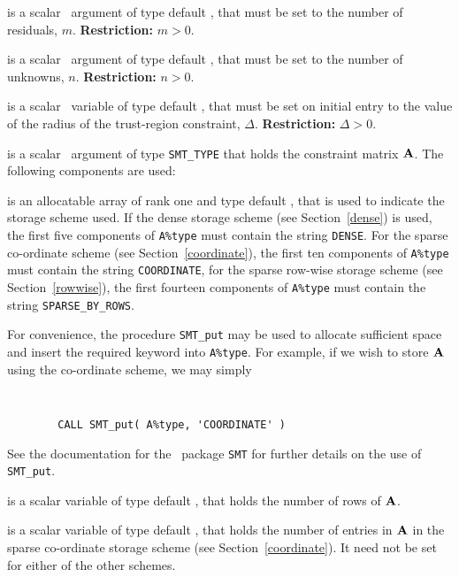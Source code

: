 \documentclass{galahad}
\begin{document}
\begin{description}

 is a scalar \intentin\ argument of type default \integer, that must be
set to the number of residuals, $m$. {\bf Restriction: } $m  >  0$.

 is a scalar \intentin\ argument of type default \integer, that must be
set to the number of unknowns, $n$. {\bf Restriction: } $n  >  0$.

 is a scalar \intentin\ variable of type default \realdp,
that must be set on initial entry
to the value of the radius of the trust-region constraint, $\Delta$.
{\bf Restriction: } $\Delta > 0$.

 is a scalar \intentin\ argument of type {\tt SMT\_TYPE}
that holds the constraint matrix ${\mathbf{A}}$. The following components are used:

\begin{description}

 is an allocatable array of rank one and type default
\character, that
is used to indicate the storage scheme used. If the dense storage scheme
(see Section~\ref{dense}) is used,
the first five components of {\tt A\%type} must contain the
string {\tt DENSE}.
For the sparse co-ordinate scheme (see Section~\ref{coordinate}),
the first ten components of {\tt A\%type} must contain the
string {\tt COORDINATE},
for the sparse row-wise storage scheme (see Section~\ref{rowwise}),
the first fourteen components of {\tt A\%type} must contain the
string {\tt SPARSE\_BY\_ROWS}.

For convenience, the procedure {\tt SMT\_put}
may be used to allocate sufficient space and insert the required keyword
into {\tt A\%type}.
For example, if we wish to store ${\mathbf{A}}$ using the co-ordinate scheme,
we may simply
{\tt
\begin{verbatim}
        CALL SMT_put( A%type, 'COORDINATE' )
\end{verbatim}
}
\noindent
See the documentation for the \galahad\ package {\tt SMT}
for further details on the use of {\tt SMT\_put}.

 is a scalar variable of type default \integer, that
holds the number of rows of ${\mathbf{A}}$.

 is a scalar variable of type default \integer, that
holds the number of entries in ${\mathbf{A}}$
in the sparse co-ordinate storage scheme (see Section~\ref{coordinate}).
It need not be set for either of the other schemes.


\end{description}
\end{description}
\end{document}
